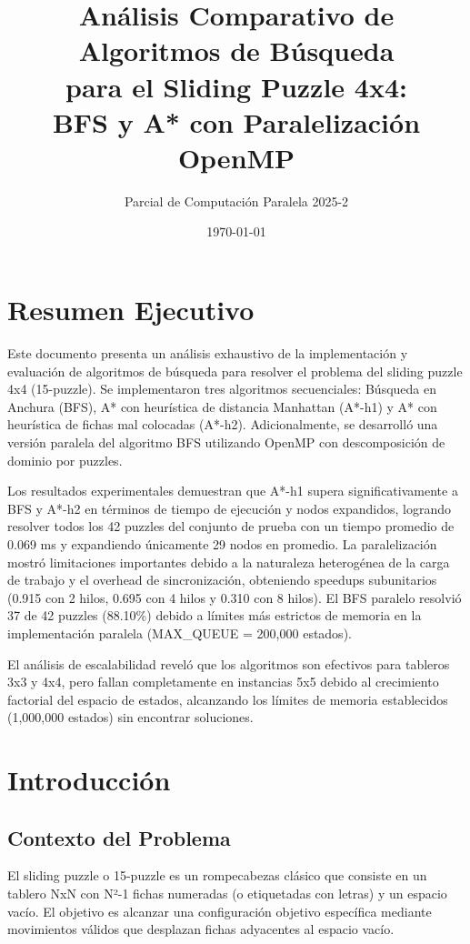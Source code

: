 \documentclass[12pt,a4paper]{article}
\title{\textbf{Análisis Comparativo de Algoritmos de Búsqueda\\para el Sliding Puzzle 4x4:\\BFS y A* con Paralelización OpenMP}}
\author{Parcial de Computación Paralela 2025-2}
\date{\today}
\begin{document}
\maketitle
\newpage

\tableofcontents
\newpage

\section{Resumen Ejecutivo}

Este documento presenta un análisis exhaustivo de la implementación y evaluación de algoritmos de búsqueda para resolver el problema del sliding puzzle 4x4 (15-puzzle). Se implementaron tres algoritmos secuenciales: Búsqueda en Anchura (BFS), A* con heurística de distancia Manhattan (A*-h1) y A* con heurística de fichas mal colocadas (A*-h2). Adicionalmente, se desarrolló una versión paralela del algoritmo BFS utilizando OpenMP con descomposición de dominio por puzzles.

Los resultados experimentales demuestran que A*-h1 supera significativamente a BFS y A*-h2 en términos de tiempo de ejecución y nodos expandidos, logrando resolver todos los 42 puzzles del conjunto de prueba con un tiempo promedio de 0.069 ms y expandiendo únicamente 29 nodos en promedio. La paralelización mostró limitaciones importantes debido a la naturaleza heterogénea de la carga de trabajo y el overhead de sincronización, obteniendo speedups subunitarios (0.915 con 2 hilos, 0.695 con 4 hilos y 0.310 con 8 hilos). El BFS paralelo resolvió 37 de 42 puzzles (88.10\%) debido a límites más estrictos de memoria en la implementación paralela (MAX\_QUEUE = 200,000 estados).

El análisis de escalabilidad reveló que los algoritmos son efectivos para tableros 3x3 y 4x4, pero fallan completamente en instancias 5x5 debido al crecimiento factorial del espacio de estados, alcanzando los límites de memoria establecidos (1,000,000 estados) sin encontrar soluciones.

\section{Introducción}

\subsection{Contexto del Problema}

El sliding puzzle o 15-puzzle es un rompecabezas clásico que consiste en un tablero NxN con N²-1 fichas numeradas (o etiquetadas con letras) y un espacio vacío. El objetivo es alcanzar una configuración objetivo específica mediante movimientos válidos que desplazan fichas adyacentes al espacio vacío.
\end{document}
